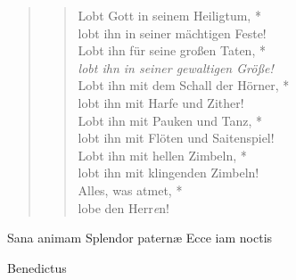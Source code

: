 \begin{quote}
\begin{verse}
 Lobt Gott in seinem Heiligtum, *\\
lobt ihn in seiner mächtigen Feste! \\
\vin Lobt ihn für seine großen Taten, *\\
\vin \textit{lobt ihn in seiner gewaltigen Größe!}\\
Lobt ihn mit dem Schall der Hörner, *\\
lobt ihn mit Harfe und Zither! \\
\vin Lobt ihn mit Pauken und Tanz, *\\
\vin lobt ihn mit Flöten und Saitenspiel! \\
Lobt ihn mit hellen Zimbeln, *\\
lobt ihn mit klingenden Zimbeln!\\
\vin Alles, was atmet, *\\
\vin lobe den Herr\textit{e}n!\\

\end{verse}
\end{quote}


\noindent{} Sana animam  Splendor paternæ  Ecce iam noctis \\
\begin{flushleft}


\medskip

{\rm{
}}
\end{flushleft}

\def\greinitialformat#1{{\fontsize{40}{40}\selectfont #1}}
\gresetfirstlineaboveinitial{\small \textcolor{red}{Benedic.}}{}
\setaboveinitialseparation{0.72mm}


\vspace{0.3cm}
 Benedictus 